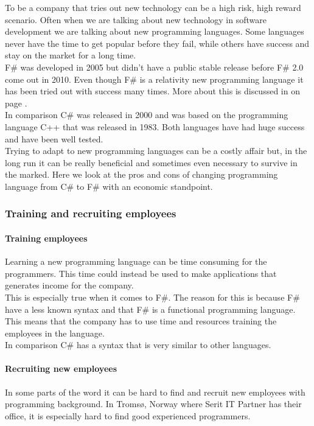 \documentclass[12pt, a4paper]{article}
\begin{document}
To be a company that tries out new technology can be a high risk, high reward scenario. Often when we are talking about new technology in software development we are talking about new programming languages. Some languages never have the time to get popular before they fail, while others have success and stay on the market for a long time.\\

F\# was developed in 2005 but didn't have a public stable release before F\# 2.0 come out in 2010. Even though F\# is a relativity new programming language it has been tried out with success many times. More about this is discussed in  on page \pageref{Testimonials}.\\

In comparison C\# was released in 2000 and was based on the programming language C++ that was released in 1983. Both languages have had huge success and have been well tested.\\

Trying to adapt to new programming languages can be a costly affair but, in the long run it can be really beneficial and sometimes even necessary to survive in the marked. Here we look at the pros and cons of changing programming language from C\# to F\# with an economic standpoint.

\newpage
\subsubsection{Training and recruiting employees}

\paragraph{Training employees}
Learning a new programming language can be time consuming for the programmers. This time could instead be used to make applications that generates income for the company.\\

This is especially true when it comes to F\#. The reason for this is because F\# have a less known syntax and that F\# is a functional programming language. This means that the company has to use time and resources training the employees in the language.\\

In comparison C\# has a syntax that is very similar to other languages.

\paragraph{Recruiting new employees}
In some parts of the word it can be hard to find and recruit new employees with programming background. In Tromsø, Norway where Serit IT Partner has their office, it is especially hard to find good experienced programmers.\\
\end{document}
